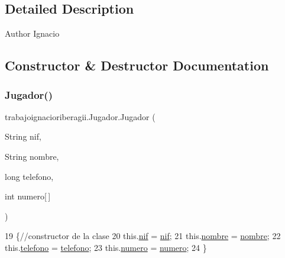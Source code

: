 \subsection{Detailed Description}
\begin{DoxyAuthor}{Author}
Ignacio 
\end{DoxyAuthor}


\subsection{Constructor \& Destructor Documentation}
\mbox{\label{classtrabajoignacioriberagii_1_1_jugador_a024a8940a1e72d329342ec04bc1caefc}} 
\subsubsection{\texorpdfstring{Jugador()}{Jugador()}}
{\footnotesize\ttfamily trabajoignacioriberagii.\+Jugador.\+Jugador (\begin{DoxyParamCaption}\item[{String}]{nif,  }\item[{String}]{nombre,  }\item[{long}]{telefono,  }\item[{int}]{numero\mbox{[}$\,$\mbox{]} }\end{DoxyParamCaption})\hspace{0.3cm}{\ttfamily [inline]}}


\begin{DoxyCode}
19                                                                             \{\textcolor{comment}{//constructor de la clase}
20         this.\mbox{\hyperlink{classtrabajoignacioriberagii_1_1_jugador_aae9c316bdd5626ce8e14bb067221404e}{nif}} = \mbox{\hyperlink{classtrabajoignacioriberagii_1_1_jugador_aae9c316bdd5626ce8e14bb067221404e}{nif}};
21         this.\mbox{\hyperlink{classtrabajoignacioriberagii_1_1_jugador_a1c506d4c25f6c68c14b84aa80eea10b6}{nombre}} = \mbox{\hyperlink{classtrabajoignacioriberagii_1_1_jugador_a1c506d4c25f6c68c14b84aa80eea10b6}{nombre}};
22         this.\mbox{\hyperlink{classtrabajoignacioriberagii_1_1_jugador_ae739daa3303ea17e6f041ad860b04b3e}{telefono}} = \mbox{\hyperlink{classtrabajoignacioriberagii_1_1_jugador_ae739daa3303ea17e6f041ad860b04b3e}{telefono}};
23         this.\mbox{\hyperlink{classtrabajoignacioriberagii_1_1_jugador_a9c212c71c30fe0722972df3a966b5e07}{numero}} = \mbox{\hyperlink{classtrabajoignacioriberagii_1_1_jugador_a9c212c71c30fe0722972df3a966b5e07}{numero}};
24     \}
\end{DoxyCode}


